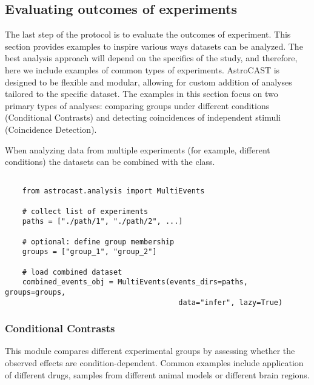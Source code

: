 \subsection{Evaluating outcomes of experiments}


The last step of the protocol is to evaluate the outcomes of experiment. This section provides examples to inspire various ways datasets can be analyzed. The best analysis approach will depend on the specifics of the study, and therefore, here we include examples of common types of experiments. AstroCAST is designed to be flexible and modular, allowing for custom addition of analyses tailored to the specific dataset. The examples in this section focus on two primary types of analyses: comparing groups under different conditions (Conditional Contrasts) and detecting coincidences of independent stimuli (Coincidence Detection).

When analyzing data from multiple experiments (for example, different conditions) the datasets can be combined with the  class.

\begin{lstlisting}[style=pyStyle]

    from astrocast.analysis import MultiEvents

    # collect list of experiments
    paths = ["./path/1", "./path/2", ...]

    # optional: define group membership
    groups = ["group_1", "group_2"]

    # load combined dataset
    combined_events_obj = MultiEvents(events_dirs=paths, groups=groups,
                                        data="infer", lazy=True)

\end{lstlisting}

\subsubsection{Conditional Contrasts}
This module compares different experimental groups by assessing whether the observed effects are condition-dependent. Common examples include application of different drugs, samples from different animal models or different brain regions.

